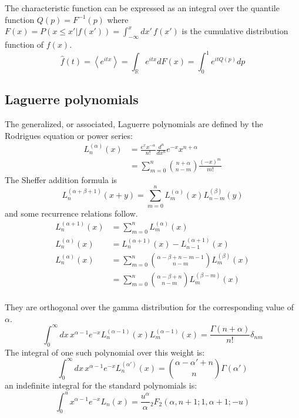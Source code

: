 \documentclass{article}
\newcommand{\intR}{\int_{\mathbb{R}}}
\begin{document}
The characteristic function can be expressed as an integral over the quantile
function $Q(p) = F^{-1}(p)$ where $F(x) = P(x \leq x'|f(x')) = \int_{-\infty}^{x} dx'\,f(x')$ is the
cumulative distribution function of $f(x)$.
\begin{equation}
	\hat f (t) = \left< e^{itx} \right> = \intR e^{itx} dF(x) = \int_0^{1} e^{itQ(p)} dp
\end{equation}

\subsection*{Laguerre polynomials}
The generalized, or associated, Laguerre polynomials are defined by the
Rodrigues equation or power series:
\begin{align}
	\label{eq:lag_rod}
	L_n^{(\alpha)}(x) & = \frac{e^x x^{-\alpha}}{n!} \frac{d^n}{dx^n}e^{-x}x^{n+\alpha} \\
	                  & = \sum_{m=0}^{n} \binom{n+\alpha}{n-m} \frac{(-x)^m}{m!}
\end{align}
The Sheffer addition formula is
\begin{equation}
	L_n^{(\alpha + \beta + 1)}(x+y) = \sum_{m=0}^n L_m^{(\alpha)} (x) L_{n-m}^{(\beta)}(y)
\end{equation}
and some recurrence relations follow.
\begin{align}
	L_n^{(\alpha+1)}(x) & = \sum_{m=0}^n L_{m}^{(\alpha)}(x)                                        \\
	L_n^{(\alpha)}(x)   & = L_{n}^{(\alpha+1)}(x) - L_{n-1}^{(\alpha+1)}(x)                         \\
	L_n^{(\alpha)}(x)   & = \sum_{m=0}^n \binom{\alpha - \beta + n - m - 1}{n-m} L_{m}^{(\beta)}(x) \\
	                    & = \sum_{m=0}^n \binom{\alpha - \beta + n}{n-m} L_{m}^{(\beta-m)}(x)       \\
\end{align}

They are orthogonal over the gamma distribution for the corresponding value of $\alpha$.
\begin{equation}
	\int_0^\infty dx\, x^{\alpha-1} e^{-x} L_n^{(\alpha-1)}(x) L_{m}^{(\alpha-1)}(x) = \frac{\Gamma(n+\alpha)}{n!} \delta_{nm}
\end{equation}
The integral of one such polynomial over this weight is:
\begin{equation}
	\int_0^\infty dx\, x^{\alpha-1} e^{-x} L_n^{(\alpha')}(x) = \binom{\alpha - \alpha' + n}{n} \Gamma(\alpha')
\end{equation}
an indefinite integral for the standard polynomials is:
\begin{equation}
	\int_0^u x^{\alpha-1} e^{-x} L_n(x) = \frac{u^\alpha}{\alpha} {}_2 F_2(\alpha, n+1; 1, \alpha+1; -u)
\end{equation}
\end{document}
